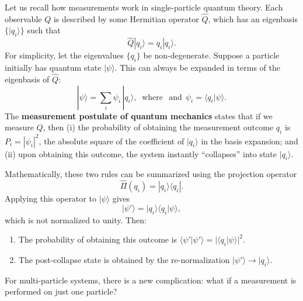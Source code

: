 \documentclass[pra,12pt]{revtex4}
\begin{document}
Let us recall how measurements work in single-particle quantum theory.
Each observable $Q$ is described by some Hermitian operator $\hat{Q}$,
which has an eigenbasis $\{|q_i\rangle\}$ such that
\begin{equation}
  \hat{Q}|q_i\rangle = q_i |q_i\rangle.
\end{equation}
For simplicity, let the eigenvalues $\{q_i\}$ be non-degenerate.
Suppose a particle initially has quantum state $|\psi\rangle$.  This
can always be expanded in terms of the eigenbasis of $\hat{Q}$:
\begin{equation}
  |\psi\rangle = \sum_i \psi_i\, |q_i\rangle, \;\;\mathrm{where}\;\;\,\textrm{and}\;\, \psi_i = \langle q_i|\psi\rangle.
\end{equation}
The \textbf{measurement postulate of quantum mechanics} states that if
we measure $Q$, then (i) the probability of obtaining the measurement
outcome $q_i$ is $P_i = |\psi_i|^2$, the absolute square of the
coefficient of $|q_i\rangle$ in the basis expansion; and (ii) upon
obtaining this outcome, the system instantly ``collapses'' into state
$|q_i\rangle$.

Mathematically, these two rules can be summarized using the projection
operator
\begin{equation}
  \hat{\Pi}(q_i) = |q_i\rangle\langle q_i|.
\end{equation}
Applying this operator to $|\psi\rangle$ gives
\begin{equation}
  |\psi'\rangle = |q_i\rangle \langle q_i|\psi\rangle,
\end{equation}
which is not normalized to unity.  Then:
\begin{enumerate}
\item The probability of obtaining this outcome is
  $\langle\psi'|\psi'\rangle = |\langle q_i|\psi\rangle|^2$.

\item The post-collapse state is obtained by the re-normalization
  $|\psi'\rangle \rightarrow |q_i\rangle$.
\end{enumerate}

For multi-particle systems, there is a new complication: what if a
measurement is performed on just one particle?
\end{document}
